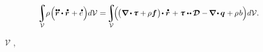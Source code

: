 \nopagebreak\vspace{-0.15em}\begin{equation*}
\scalebox{0.95}{$%
\displaystyle\integral\displaylimits_{\mathcal{V}} \hspace{-0.55ex} \rho \hspace{.15ex} \Bigl( \mathdotdotabove{\currentlocationvector} \dotp \mathdotabove{\currentlocationvector} \hspace{.1ex} + \mathdotabove{e} \hspace{.1ex}
\Bigr) d\mathcal{V}
$}
= \hspace{-0.33ex}
\scalebox{0.95}{$%
\displaystyle\integral\displaylimits_{\mathcal{V}} \hspace{-0.55ex} \Bigl( \hspace{-0.2ex}
\bigl( \hspace{.1ex} \boldnabla \hspace{-0.1ex} \dotp \hspace{-0.1ex} \cauchystress + \hspace{-0.1ex} \rho \bm{f} \hspace{.15ex} \bigr) \hspace{-0.33ex} \dotp \mathdotabove{\currentlocationvector} \hspace{.2ex}
+ \cauchystress \dotdotp \hspace{-0.11ex} \rateofdeformationtensor
- \hspace{-0.16ex} \boldnabla \hspace{-0.2ex} \dotp \hspace{-0.1ex} \heatfluxvector \hspace{.1ex}
+ \hspace{-0.1ex} \rho \hspace{.2ex} b
\Bigr) d\mathcal{V}
$}
.
\end{equation*}

\vspace{-0.16em}\noindent
{}  ~${\mathcal{V}}$ ,  

